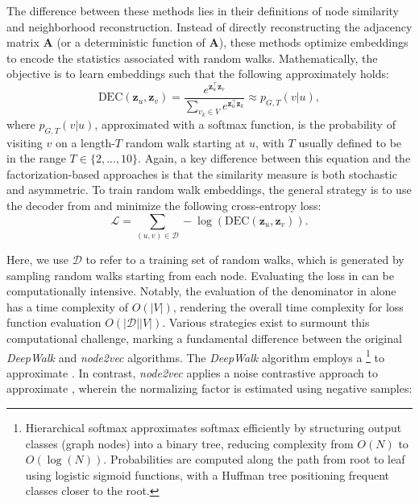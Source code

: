 The difference between these methods lies in their definitions of node similarity and neighborhood reconstruction. Instead of directly reconstructing the adjacency matrix $ \mathbf{A} $ (or a deterministic function of $ \mathbf{A} $), these methods optimize embeddings to encode the statistics associated with random walks. Mathematically, the objective is to learn embeddings such that the following approximately holds:
\begin{equation}\label{eq:randomWalkdec}
    \text{DEC}(\mathbf{z}_u, \mathbf{z}_v) = \frac{e^{\mathbf{z}_u^\top\mathbf{z}_v}}{\sum_{v_k\in V} e^{\mathbf{z}_u^\top\mathbf{z}_k}} \approx p_{G,T}(v|u),
\end{equation}
where $p_{G,T}(v|u)$, approximated with a softmax function, is the probability of visiting $v$ on a length-$T$ random walk starting at $u$, with $T$ usually defined to be in the range $T\in\{2,...,10\}$. Again, a key difference between this equation and the factorization-based approaches is that the similarity measure is both stochastic and asymmetric.
To train random walk embeddings, the general strategy is to use the decoder from  and minimize the following cross-entropy loss:
\begin{equation}\label{eq:randomWalkloss}
    \mathcal{L} = \sum_{(u,v)\in\mathcal{D}} -\log(\text{DEC}(\mathbf{z}_u, \mathbf{z}_v)).
\end{equation}

Here, we use $\mathcal{D}$ to refer to a training set of random walks, which is generated by sampling random walks starting from each node.
Evaluating the loss in  can be computationally intensive. Notably, the evaluation of the denominator in  alone has a time complexity of $ O(|V|) $, rendering the overall time complexity for loss function evaluation $ O(|\mathcal{D}||V|) $. Various strategies exist to surmount this computational challenge, marking a fundamental difference between the original \textit{DeepWalk} and \textit{node2vec} algorithms. The \textit{DeepWalk} algorithm employs a \footnote{Hierarchical softmax approximates softmax efficiently by structuring output classes (graph nodes) into a binary tree, reducing complexity from $ O(N) $ to $ O(\log(N)) $. Probabilities are computed along the path from root to leaf using logistic sigmoid functions, with a Huffman tree positioning frequent classes closer to the root.} to approximate . In contrast, \textit{node2vec} applies a noise contrastive approach to approximate , wherein the normalizing factor is estimated using negative samples:

